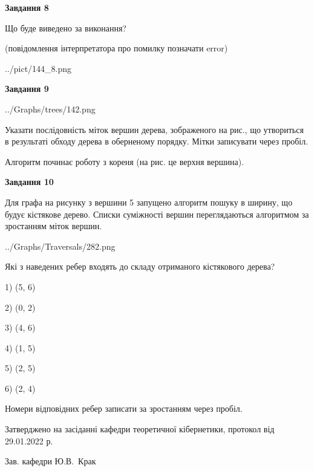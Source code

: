 \documentclass[12pt, ukrainian]{article}
\begin{document}
{\begin {large}
{\begin {center}\textbf{Завдання 8}\end {center}}\par
Що буде виведено за виконання?\par
 (повідомлення інтерпретатора про помилку позначати error)\par
\begin{center}
	{../pict/144_8.png}
\end{center}
\newpage

{\begin {center}\textbf{Завдання 9}\end {center}}\par

\begin{center}
	{../Graphs/trees/142.png}
\end{center}
Указати послідовність міток вершин дерева, зображеного на рис., що утвориться в результаті обходу дерева в оберненому порядку. Мітки записувати через пробіл.\par Алгоритм починає роботу з кореня (на рис. це верхня вершина).\par
\newpage

{\begin {center}\textbf{Завдання 10}\end {center}}\par
Для графа на рисунку з вершини 5 запущено алгоритм пошуку в ширину, що будує кістякове дерево. Списки суміжності вершин переглядаються алгоритмом за зростанням міток вершин.\par
\begin{center}
	{../Graphs/Traversals/282.png}
\end{center}
\par Які з наведених ребер входять до складу отриманого кістякового дерева?\par
1) (5, 6)\par
2) (0, 2)\par
3) (4, 6)\par
4) (1, 5)\par
5) (2, 5)\par
6) (2, 4)\par
{\vskip 15pt} Номери відповідних ребер записати за зростанням через пробіл.\par
\newpage


\end {large}
}
{\smallskip \begin {small} Затверджено на засіданні кафедри теоретичної кібернетики, протокол  від   29.01.2022 р.\par\smallskip\smallskip
{\parbox {6.5 cm}{Зав. кафедри \dotfill Ю.В.~Крак}} \end{small}}
\end{document}

